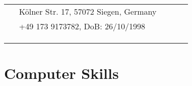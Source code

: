 \documentclass[10pt]{article} %
\begin{document}
\begin{paracol}{2}
\parbox[top][0.12\textheight][c]{\linewidth}{ %
	\vspace{-0.04\textheight} %
	\colorbox{shade}{ %
		\begin{supertabular}{p{0.05\linewidth}|p{0.795\linewidth}} %
            \raisebox{-1pt}{\faHome} & K\"{o}lner Str. 17, 57072 Siegen, Germany \\ %
			\raisebox{-1pt}{\faPhone} & +49 173 9173782, DoB: 26/10/1998 \\ %
            \raisebox{0pt}{\small\faEnvelope} & \\
            \raisebox{0pt}{\small\faEnvelope} & \\
           
            \raisebox{0pt}{\faGithub} & \\ %
		\end{supertabular}
	}
}


\section{Computer Skills}





\end{paracol}
\end{document}
